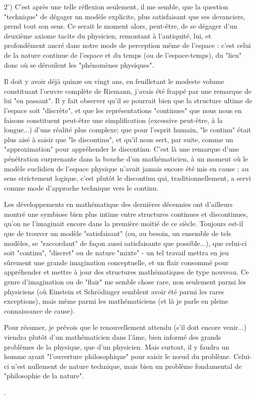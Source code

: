 {$2^{\circ}$) C'est après une telle réflexion seulement, il me semble, que la question "technique" de dégager un modèle explicite, plus satisfaisant que ses devanciers, prend tout son sens. Ce serait le moment alors, peut-être, de se dégager d'un deuxième axiome tacite du physicien, remontant à l'antiquité, lui, et profondément ancré dans notre mode de perception même de l'espace : c'est celui de la nature continue de l'espace et du temps (ou de l'espace-temps), du "lieu" donc où se déroulent les "phénomènes physiques".

Il doit y avoir déjà quinze ou vingt ans, en feuilletant le modeste volume constituant l'œuvre complète de Riemann, j'avais été frappé par une remarque de lui "en passant". Il y fait observer qu'il se pourrait bien que la structure ultime de l'espace soit "discrète", et que les représentations "continues" que nous nous en faisons constituent peut-être une simplification (excessive peut-être, à la longue...) d'une réalité plus complexe; que pour l'esprit humain, "le continu" était plus aisé à saisir que "le discontinu", et qu'il nous sert, par suite, comme un "approximation" pour appréhender le discontinu. C'est là une remarque d'une pénétration surprenante dans la bouche d'un mathématicien, à un moment où le modèle euclidien de l'espace physique n'avait jamais encore été mis en cause ; au sens strictement logique, c'est plutôt le discontinu qui, traditionnellement, a servi comme mode d'approche technique vers le continu.

Les développements en mathématique des dernières décennies ont d'ailleurs montré une symbiose bien plus intime entre structures continues et discontinues, qu'on ne l'imaginait encore dans la première moitié de ce siècle. Toujours est-il que de trouver un modèle "satisfaisant" (ou, au besoin, un ensemble de tels modèles, se "raccordant" de façon aussi satisfaisante que possible...), que celui-ci soit "continu", "discret" ou de nature "mixte" - un tel travail mettra en jeu sûrement une grande imagination conceptuelle, et un flair consommé pour appréhender et mettre à jour des structures mathématiques de type nouveau. Ce genre d'imagination ou de "flair" me semble chose rare, non seulement parmi les physiciens (où Einstein et Schrödinger semblent avoir été parmi les rares exceptions), mais même parmi les mathématiciens (et là je parle en pleine connaissance de cause).

Pour résumer, je prévois que le renouvellement attendu (s'il doit encore venir...) viendra plutôt d'un mathématicien dans l'âme, bien informé des grands problèmes de la physique, que d'un physicien. Mais surtout, il y faudra un homme ayant "l'ouverture philosophique" pour saisir le nœud du problème. Celui-ci n'est nullement de nature technique, mais bien un problème fondamental de "philosophie de la nature".}.

